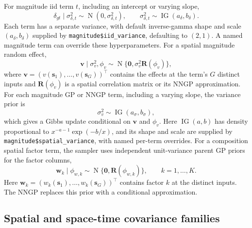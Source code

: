 \documentclass[11pt]{article}
\newcommand{\bv}{\bm{v}}
\newcommand{\bw}{\bm{w}}
\newcommand{\bR}{\bm{R}}
\newcommand{\bzero}{\bm{0}}
\newcommand{\bs}{\bm{s}}
\newcommand{\trans}{^\top}
\newcommand{\Normal}{\operatorname{N}}
\begin{document}
For magnitude iid term \(t\), including an intercept or varying slope,
\begin{equation}
  \delta_{gt} \mid \sigma_{\delta,t}^2 \sim \Normal(0,\sigma_{\delta,t}^2),
  \qquad
  \sigma_{\delta,t}^2 \sim \operatorname{IG}(a_\delta,b_\delta).
  \label{eq:iid-prior}
\end{equation}
Each term has a separate variance, with default inverse-gamma shape and scale
\((a_\delta,b_\delta)\) supplied by \texttt{magnitude\$iid\_variance}, defaulting to \((2,1)\). A named magnitude term can override these hyperparameters.
For a spatial magnitude random effect,
\begin{equation}
  \bv \mid \sigma_v^2,\phi_v
  \sim
  \Normal\{\bzero,\sigma_v^2\bR(\phi_v)\},
  \label{eq:spatial-prior}
\end{equation}
where \(\bv=(v(\bs_1),\ldots,v(\bs_G))\trans\) contains the effects at the
term's \(G\) distinct inputs and \(\bR(\phi_v)\) is a
spatial correlation matrix or its NNGP approximation.
For each magnitude GP or NNGP term, including a varying slope, the variance prior is
\begin{equation}
  \sigma_v^2 \sim \operatorname{IG}(a_\sigma,b_\sigma),
  \label{eq:magnitude-nngp-variance-prior}
\end{equation}
which gives a Gibbs update conditional on \(\bv\) and \(\phi_v\).
Here \(\operatorname{IG}(a,b)\) has density proportional to
\(x^{-a-1}\exp(-b/x)\), and its shape and scale are supplied by
\texttt{magnitude\$spatial\_variance}, with named per-term overrides.
For a composition spatial factor term, the sampler uses independent
unit-variance parent GP priors for the factor columns,
\begin{equation}
  \bw_k
  \mid \phi_{w,k}
  \sim
  \Normal\{\bzero,\bR(\phi_{w,k})\},
  \qquad
  k=1,\ldots,K.
  \label{eq:composition-factor-nngp-prior}
\end{equation}
Here \(\bw_k=(w_k(\bs_1),\ldots,w_k(\bs_G))\trans\) contains factor \(k\)
at the distinct inputs. The NNGP replaces this prior with a conditional
approximation.

\subsection{Spatial and space-time covariance families}
\label{sec:covariance-families}
\end{document}
